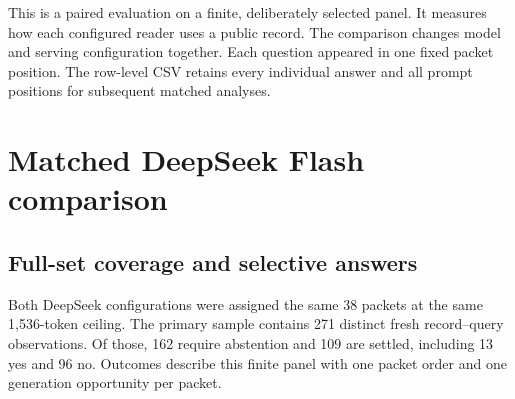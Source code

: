 \documentclass[11pt,letterpaper]{article}
\begin{document}
This is a paired evaluation on a finite, deliberately selected panel. It measures how each configured reader uses a public record. The comparison changes model and serving configuration together. Each question appeared in one fixed packet position. The row-level CSV retains every individual answer and all prompt positions for subsequent matched analyses.

\clearpage
\section*{Matched DeepSeek Flash comparison}

\subsection{Full-set coverage and selective answers}

Both DeepSeek configurations were assigned the same 38 packets at the same 1,536-token ceiling. The primary sample contains 271 distinct fresh record–query observations. Of those, 162 require abstention and 109 are settled, including 13 yes and 96 no. Outcomes describe this finite panel with one packet order and one generation opportunity per packet.
\end{document}
